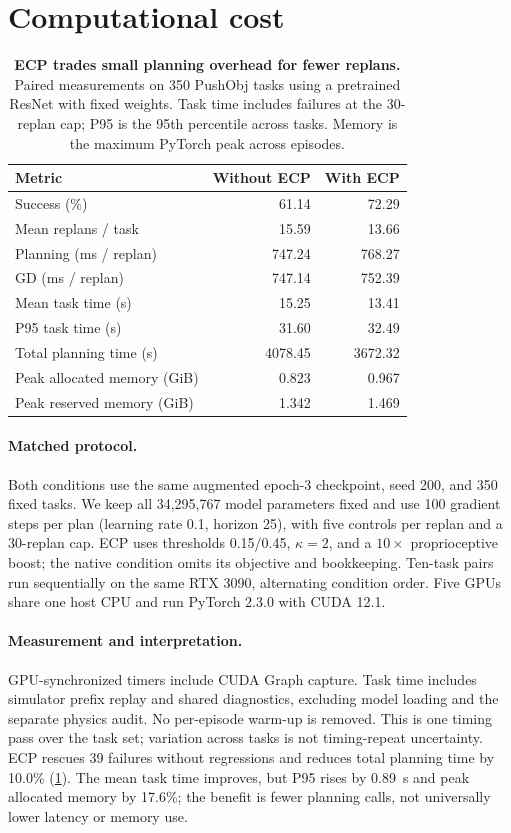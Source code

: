 \section{Computational cost}
\label{sec:cost}
\begin{table}[t]
\centering
\caption{\textbf{ECP trades small planning overhead for fewer replans.} Paired measurements on 350 PushObj tasks using a pretrained ResNet with fixed weights. Task time includes failures at the 30-replan cap; P95 is the 95th percentile across tasks. Memory is the maximum PyTorch peak across episodes.}
\label{tab:cost}
\small
\setlength{\tabcolsep}{3.5pt}
\begin{tabular*}{\columnwidth}{@{\extracolsep{\fill}}lrr@{}}
\toprule
Metric & Without ECP & With ECP\\
\midrule
Success (\%) &61.14&72.29\\
Mean replans / task &15.59&13.66\\
Planning (ms / replan) &747.24&768.27\\
GD (ms / replan) &747.14&752.39\\
Mean task time (s) &15.25&13.41\\
P95 task time (s) &31.60&32.49\\
Total planning time (s) &4078.45&3672.32\\
Peak allocated memory (GiB) &0.823&0.967\\
Peak reserved memory (GiB) &1.342&1.469\\
\bottomrule
\end{tabular*}
\end{table}

\paragraph{Matched protocol.}
Both conditions use the same augmented epoch-3 checkpoint, seed 200, and 350 fixed tasks. We keep all 34,295,767 model parameters fixed and use 100 gradient steps per plan (learning rate 0.1, horizon 25), with five controls per replan and a 30-replan cap. ECP uses thresholds 0.15/0.45, $\kappa=2$, and a $10\times$ proprioceptive boost; the native condition omits its objective and bookkeeping. Ten-task pairs run sequentially on the same RTX 3090, alternating condition order. Five GPUs share one host CPU and run PyTorch 2.3.0 with CUDA 12.1.

\paragraph{Measurement and interpretation.}
GPU-synchronized timers include CUDA Graph capture. Task time includes simulator prefix replay and shared diagnostics, excluding model loading and the separate physics audit. No per-episode warm-up is removed. This is one timing pass over the task set; variation across tasks is not timing-repeat uncertainty. ECP rescues 39 failures without regressions and reduces total planning time by 10.0\% (\cref{tab:cost}). The mean task time improves, but P95 rises by 0.89~s and peak allocated memory by 17.6\%; the benefit is fewer planning calls, not universally lower latency or memory use.
